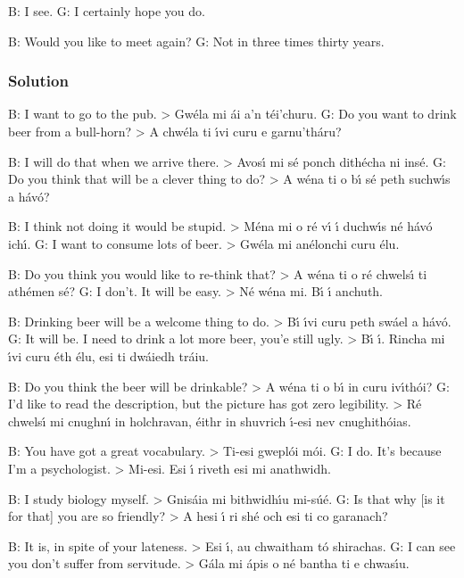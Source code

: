 B: I see.
G: I certainly hope you do.

B: Would you like to meet again?
G: Not in three times thirty years.

\newpage
\subsubsection{Solution}

B: I want to go to the pub. > Gw\'{e}la mi \'{a}i a'n t\'{e}i'churu.
G: Do you want to drink beer from a bull-horn? > A chw\'{e}la ti \'{\i}vi curu e garnu'th\'{a}ru?

B: I will do that when we arrive there. > Avos\'{\i} mi s\'{e} ponch dith\'{e}cha ni ins\'{e}.
G: Do you think that will be a clever thing to do? > A w\'{e}na ti o b\'{\i} s\'{e} peth suchw\'{\i}s a h\'{a}v\'{o}?

B: I think not doing it would be stupid. > M\'{e}na mi o r\'{e} v\'{\i} \'{\i} duchw\'{\i}s n\'{e} h\'{a}v\'{o} ich\'{\i}.
G: I want to consume lots of beer. > Gw\'{e}la mi an\'{e}lonchi curu \'{e}lu.

B: Do you think you would like to re-think that? > A w\'{e}na ti o r\'{e} chwels\'{\i} ti ath\'{e}men s\'{e}?
G: I don't. It will be easy. > N\'{e} w\'{e}na mi. B\'{\i} \'{\i} anchuth.

B: Drinking beer will be a welcome thing to do. > B\'{\i} \'{\i}vi curu peth sw\'{a}el a h\'{a}v\'{o}.
G: It will be. I need to drink a lot more beer, you'e still ugly. > B\'{\i} \'{\i}. Rincha mi \'{\i}vi curu \'{e}th \'{e}lu, esi ti dw\'{a}iedh tr\'{a}iu.

B: Do you think the beer will be drinkable? > A w\'{e}na ti o b\'{\i} in curu iv\'{\i}th\'{o}i?
G: I'd like to read the description, but the picture has got zero legibility. > R\'{e} chwels\'{\i} mi cnughn\'{\i} in holchravan, \'{e}ithr in shuvrich \'{\i}-esi nev cnughith\'{o}ias.

B: You have got a great vocabulary. > Ti-esi gwepl\'{o}i m\'{o}i.
G: I do. It's because I'm a psychologist. > Mi-esi. Esi \'{\i} riveth esi mi anathwidh.

B: I study biology myself. > Gnis\'{a}ia mi bithwidh\'{\i}u mi-s\'{u}\'{e}.
G: Is that why [is it for that] you are so friendly? > A hesi \'{\i} ri sh\'{e} och esi ti co garanach?

B: It is, in spite of your lateness. > Esi \'{\i}, au chwaitham t\'{o} shirachas.
G: I can see you don't suffer from servitude. > G\'{a}la mi \'{a}pis o n\'{e} bantha ti e chwas\'{\i}u.

